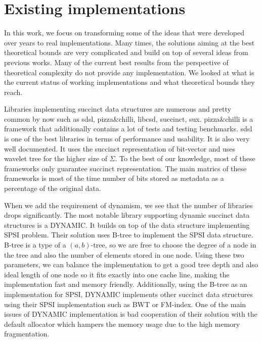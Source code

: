 \section{Existing implementations}

In this work, we focus on transforming some of the ideas that were developed over years to real implementations. Many times, the solutions aiming at the best theoretical bounds are very complicated and build on top of several ideas from previous works. Many of the current best results from the perspective of theoretical complexity do not provide any implementation. We looked at what is the current status of working implementations and what theoretical bounds they reach.

Libraries implementing succinct data structures are numerous and pretty common by now such as sdsl\cite{gog2014theory}, pizza\&chilli\cite{pizza-chilli}, libcsd\cite{brisaboa2011compressed}, succinct\cite{succinct}, sux\cite{sux}. pizza\&chilli is a framework that additionally contains a lot of tests and testing benchmarks. sdsl is one of the best libraries in terms of performance and usability. It is also very well documented. It uses the succinct representation of bit-vector and uses wavelet tree for the higher size of $\Sigma$. To the best of our knowledge, most of these frameworks only guarantee succinct representation. The main matrics of these frameworks is most of the time number of bits stored as metadata as a percentage of the original data.

When we add the requirement of dynamism, we see that the number of libraries drops significantly. The most notable library supporting 
dynamic succinct data structures is a DYNAMIC\cite{prezza2017framework}. It builds on top of the data structure implementing SPSI problem. Their solution uses B-tree to implement the SPSI data structure. B-tree is a type of a $(a, b)$-tree, so we are free to choose the degree of a node in the tree and also the number of elements stored in one node. Using these two parameters, we can balance the implementation to get a good tree depth and also ideal length of one node so it fits exactly into one cache line, making the implementation fast and memory friendly. Additionally, using the B-tree as an implementation for SPSI, DYNAMIC implements other succinct
data structures using their SPSI implementation such as BWT or FM-index. One of the main issues of DYNAMIC implementation is bad cooperation of their solution with the default allocator which hampers the memory usage due to the high memory fragmentation.

